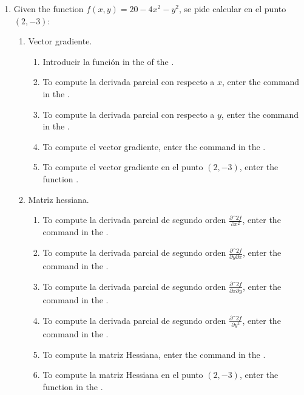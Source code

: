\begin{enumerate}[leftmargin=*]
\item Given the function $f(x,y)=20-4x^2-y^2$, se pide calcular en el punto $(2,-3)$:
      \begin{enumerate}
      \item Vector gradiente.
            \begin{indication}
            \begin{enumerate}
            \item Introducir la función  in the  of the .
            \item To compute la derivada parcial con respecto a $x$, enter the command  in the .
            \item To compute la derivada parcial con respecto a $y$, enter the command  in the .
            \item To compute el vector gradiente, enter the command  in the .
            \item To compute el vector gradiente en el punto $(2,-3)$, enter the function .
            \end{enumerate}
            \end{indication}

      \item Matriz hessiana.
            \begin{indication}
            \begin{enumerate}
            \item To compute la derivada parcial de segundo orden $\frac{\partial\^2 f}{\partial x^2}$, enter the command  in the .
            \item To compute la derivada parcial de segundo orden $\frac{\partial\^2 f}{\partial y\partial x}$, enter the command  in the .
            \item To compute la derivada parcial de segundo orden $\frac{\partial\^2 f}{\partial x\partial y}$, enter the command  in the .
            \item To compute la derivada parcial de segundo orden $\frac{\partial\^2 f}{\partial y^2}$, enter the command  in the .
            \item To compute la matriz Hessiana, enter the command  in the .
            \item To compute la matriz Hessiana en el punto $(2,-3)$, enter the function  in the .
            \end{enumerate}
            \end{indication}


\end{enumerate}
\end{enumerate}
